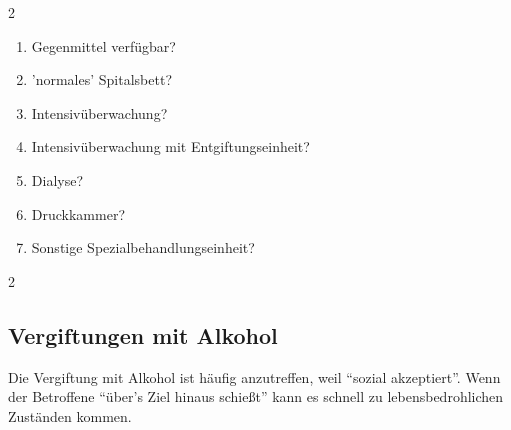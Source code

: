 {\begin{enumerate}
\begin{multicols}{2}
\begin{enumerate}\raggedbottom
    \item Gegenmittel verfügbar?
    \item 'normales' Spitalsbett?
    \item Intensivüberwachung?
    \item Intensivüberwachung mit Entgiftungseinheit?
    \item Dialyse?
    \item Druckkammer?
    \item Sonstige Spezialbehandlungseinheit?
\end{enumerate}
\end{multicols}
\end{enumerate}

}

\begin{multicols}{2}

\end{multicols}

\subsection{Vergiftungen mit Alkohol}

Die Vergiftung mit Alkohol ist häufig anzutreffen, weil
"`sozial akzeptiert"'. Wenn der Betroffene "`über's Ziel
hinaus schießt"' kann es schnell zu lebensbedrohlichen
Zuständen kommen. 



